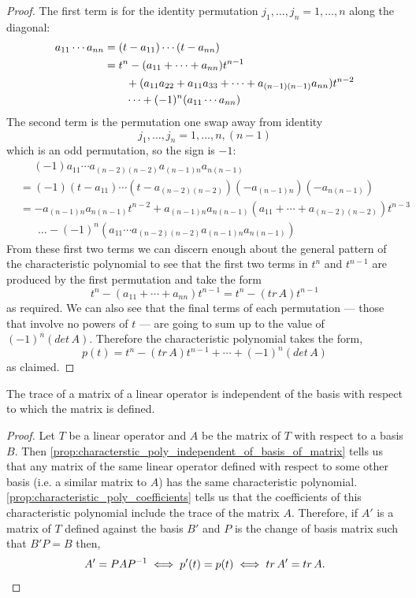 \documentclass[MathsNotesBase.tex]{subfiles}
\begin{document}
{\begin{proof}
			The first term is for the identity permutation ${ j_1,\dots,j_n = 1,\dots,n }$ along the diagonal:
			\begin{align*}
			&& a_{11} \cdots a_{nn} &= (t - a_{11})\cdots(t - a_{nn})  \\
			&& &= t^n - (a_{11} + \cdots + a_{nn})t^{n-1} \\ 
			&&&\hspace{20pt} + (a_{11}a_{22} + a_{11}a_{33} + \cdots + a_{(n-1)(n-1)}a_{nn})t^{n-2} \\
			&&&\hspace{20pt} \dots + (-1)^n(a_{11} \cdots a_{nn}) &\text{\scriptsize{}}
			\end{align*}
			The second term is the permutation one swap away from identity 
			\[ j_1,\dots,j_n = 1,\dots,n,(n-1) \]
			which is an odd permutation, so the sign is $-1$:
			\begin{align*}
			& \hspace{15pt} (-1)a_{11} \cdots a_{(n-2)(n-2)}a_{(n-1)n}a_{n(n-1)} &\\
			& =(-1)(t - a_{11}) \cdots (t - a_{(n-2)(n-2)})(-a_{(n-1)n})(-a_{n(n-1)}) & \\
			& = - a_{(n-1)n}a_{n(n-1)}t^{n-2} + a_{(n-1)n}a_{n(n-1)}(a_{11} + \cdots +  a_{(n-2)(n-2)})t^{n-3} & \\ 
			& \hspace{20pt} \dots - (-1)^n(a_{11} \cdots a_{(n-2)(n-2)}a_{(n-1)n}a_{n(n-1)}) &
			\end{align*}
			From these first two terms we can discern enough about the general pattern of the characteristic polynomial to see that the first two terms in $t^n$ and $t^{n-1}$ are produced by the first permutation and take the form
			\[ t^n - (a_{11} + \cdots + a_{nn})t^{n-1} = t^n - (tr\,A)t^{n-1} \]
			as required. We can also see that the final terms of each permutation --- those that involve no powers of $t$ --- are going to sum up to the value of ${ (-1)^n(det\,A) }$. Therefore the characteristic polynomial takes the form,
			\[ p(t) = t^n - (tr\,A)t^{n-1} + \cdots + (-1)^n(det\,A) \]
			as claimed.
		\end{proof}
	
		\bigskip
		\begin{corollary}
			\label{coro:matrix-trace-independent-of-basis}
			The trace of a matrix of a linear operator is independent of the basis with respect to which the matrix is defined.
		\end{corollary}
		\begin{proof}
			Let $T$ be a linear operator and $A$ be the matrix of $T$ with respect to a basis $B$. Then \autoref{prop:characterstic_poly_independent_of_basis_of_matrix} tells us that any matrix of the same linear operator defined with respect to some other basis (i.e. a similar matrix to $A$) has the same characteristic polynomial. \autoref{prop:characteristic_poly_coefficients} tells us that the coefficients of this characteristic polynomial include the trace of the matrix $A$. Therefore, if $A'$ is a matrix of $T$ defined against the basis $B'$ and $P$ is the change of basis matrix such that ${ B'P = B }$ then,
			\[ A' = PA{P}^{-1} \iff p'(t) = p(t) \iff tr\,A' = tr\,A.  \qedhere \]
		\end{proof}
	
}
\end{document}
